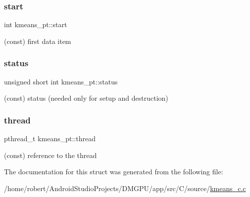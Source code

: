\mbox{\label{structkmeans__pt_a7568dca47a635b63a775853ace1a231f}} 
\subsubsection{\texorpdfstring{start}{start}}
{\footnotesize\ttfamily int kmeans\+\_\+pt\+::start}



(const) first data item 

\mbox{\label{structkmeans__pt_adc9152bce7b95fd51d6185901169c52b}} 
\subsubsection{\texorpdfstring{status}{status}}
{\footnotesize\ttfamily unsigned short int kmeans\+\_\+pt\+::status}



(const) status (needed only for setup and destruction) 

\mbox{\label{structkmeans__pt_a2648d7c598e20fdf23e9d30f43b4b17c}} 
\subsubsection{\texorpdfstring{thread}{thread}}
{\footnotesize\ttfamily pthread\+\_\+t kmeans\+\_\+pt\+::thread}



(const) reference to the thread 



The documentation for this struct was generated from the following file\+:\begin{DoxyCompactItemize}
\item 
/home/robert/\+Android\+Studio\+Projects/\+D\+M\+G\+P\+U/app/src/\+C/source/\mbox{\hyperlink{kmeans__c_8c}{kmeans\+\_\+c.\+c}}\end{DoxyCompactItemize}

